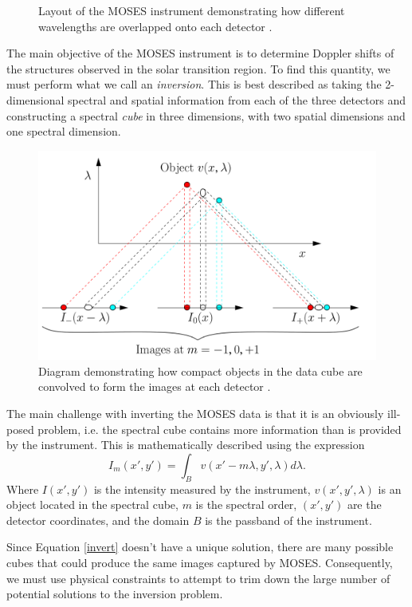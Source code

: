 \documentclass[twoside]{article}
\begin{document}
\begin{multicols}{2}
\begin{figure}[H]
	\caption{Layout of the MOSES instrument demonstrating how different wavelengths are overlapped onto each detector \cite{moses}.}
\end{figure}
The main objective of the MOSES instrument is to determine Doppler shifts of the structures observed in the solar transition region. To find this quantity, we must perform what we call an \textit{inversion}. This is best described as taking the 2-dimensional spectral and spatial information from each of the three detectors and constructing a spectral \textit{cube} in three dimensions, with two spatial dimensions and one spectral dimension.
\begin{figure}[H]
	\includegraphics[width=\linewidth]{images/inversion}
	\caption{Diagram demonstrating how compact objects in the data cube are convolved to form the images at each detector \cite{moses}.}
\end{figure}
The main challenge with inverting the MOSES data is that it is an obviously ill-posed problem, i.e. the spectral cube contains more information than is provided by the instrument. This is mathematically described using the expression
\begin{equation}
I_m(x',y') = \int_B v(x'-m \lambda,y',\lambda)d\lambda. \label{invert}
\end{equation}
Where $I(x',y')$ is the intensity measured by the instrument, $v(x',y',\lambda)$ is an object located in the spectral cube, $m$ is the spectral order, $(x',y')$ are the detector coordinates, and the domain $B$ is the passband of the instrument. 
\par Since Equation \eqref{invert} doesn't have a unique solution, there are many possible cubes that could produce the same images captured by MOSES. Consequently, we must use physical constraints to attempt to trim down the large number of potential solutions to the inversion problem. \par 


\end{multicols}
\end{document}
